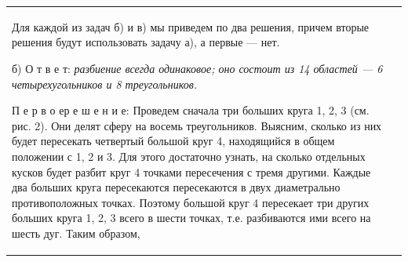 \begin{tabular}{p{50mm} p{120mm}}
\hspace{0.5cm}Для каждой из задач б) и в) мы приведем по два решения, причем вторые решения будут использовать задачу а), а первые --- нет.

б) О т в е т: \textit{разбиение всегда одинаковое; оно состоит из 14 областей --- 6 четырехугольников и 8 треугольников.}

П е р в о е\hspace{0.3cm}р е ш е н и е: Проведем сначала три больших круга 1, 2, 3 (см. рис. 2). Они делят сферу на восемь треугольников. Выясним, сколько из них будет пересекать четвертый большой круг 4, находящийся в общем положении с 1, 2 и 3. Для этого достаточно узнать, на сколько отдельных кусков будет разбит круг 4 точками пересечения с тремя другими. Каждые два больших круга пересекаются пересекаются в двух диаметрально противоположных точках. Поэтому большой круг 4 пересекает три других больших круга 1, 2, 3 всего в шести точках, т.е. разбиваются ими всего на шесть дуг. Таким образом,
\end{tabular}

